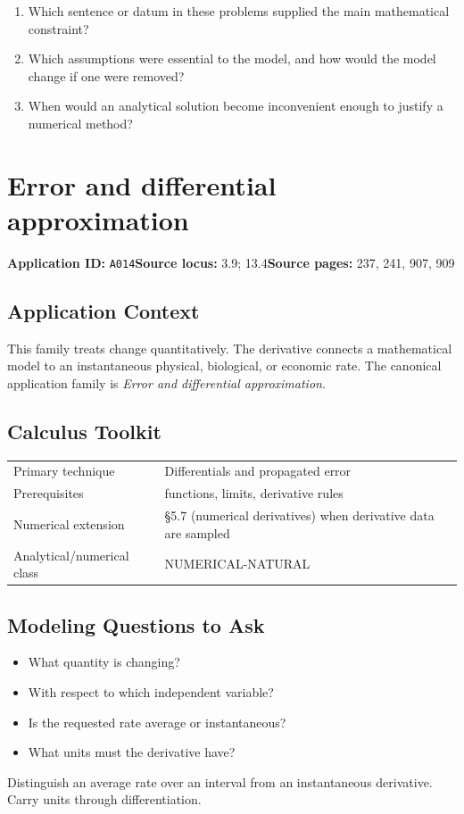 \documentclass[11pt]{book}
\newcommand{\pid}[1]{\texttt{#1}}
\begin{document}
\begin{reflectionbox}\begin{enumerate}
\item Which sentence or datum in these problems supplied the main mathematical constraint?
\item Which assumptions were essential to the model, and how would the model change if one were removed?
\item When would an analytical solution become inconvenient enough to justify a numerical method?
\end{enumerate}\end{reflectionbox}
\chapter{Error and differential approximation}\label{app:A014}
\textbf{Application ID:} \pid{A014}\quad \textbf{Source locus:} 3.9; 13.4\quad \textbf{Source pages:} 237, 241, 907, 909
\section*{Application Context}
This family treats change quantitatively. The derivative connects a mathematical model to an instantaneous physical, biological, or economic rate. The canonical application family is \emph{Error and differential approximation}.
\section*{Calculus Toolkit}
\begin{tabularx}{\textwidth}{@{}lX@{}}\toprule
Primary technique & Differentials and propagated error \\
Prerequisites & functions, limits, derivative rules \\
Numerical extension & §5.7 (numerical derivatives) when derivative data are sampled \\
Analytical/numerical class & NUMERICAL-NATURAL \\
\bottomrule\end{tabularx}
\section*{Modeling Questions to Ask}\begin{itemize}
\item What quantity is changing?
\item With respect to which independent variable?
\item Is the requested rate average or instantaneous?
\item What units must the derivative have?
\end{itemize}
\begin{errorbox}Distinguish an average rate over an interval from an instantaneous derivative. Carry units through differentiation.\end{errorbox}
\end{document}

